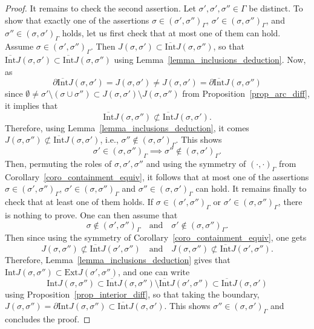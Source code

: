 \documentclass[a4paper, 11pt]{article} %
\theoremstyle{plain}
\newcommand{\Int}{\mathrm{Int}}
\newcommand{\clInt}{\overline{\mathrm{Int}}}
\newcommand{\Ext}{\mathrm{Ext}}
\newcommand{\1}{\mathds 1}
\numberwithin{equation}{section}
\begin{document}
\begin{proof}
    It remains to check the second assertion. Let $\sigma',\sigma',\sigma''\in\Gamma$ be distinct. To show that exactly one of the assertions $\sigma\in(\sigma',\sigma'')_\Gamma$, $\sigma'\in(\sigma,\sigma'')_\Gamma$, and $\sigma''\in(\sigma,\sigma')_\Gamma$ holds, let us first check that at most one of them can hold. Assume $\sigma\in(\sigma',\sigma'')_\Gamma$. Then $J(\sigma,\sigma')\subset\clInt J(\sigma,\sigma'')$, so that $\clInt J(\sigma,\sigma')\subset\clInt J(\sigma,\sigma'')$ using Lemma~\ref{lemma_inclusions_deduction}. Now, as
        \[\partial \clInt J(\sigma,\sigma')=J(\sigma,\sigma')\neq J(\sigma,\sigma')=\partial\clInt J(\sigma,\sigma'')\]
    since $\emptyset\neq\sigma'\setminus(\sigma\cup\sigma'')\subset J(\sigma,\sigma')\setminus J(\sigma,\sigma'')$ from Proposition~\ref{prop_arc_diff}, it implies that
        \[\clInt J(\sigma,\sigma'')\not\subset\clInt J(\sigma,\sigma').\]
    Therefore, using Lemma~\ref{lemma_inclusions_deduction}, it comes $J(\sigma,\sigma'')\not\subset\clInt J(\sigma,\sigma')$, i.e., $\sigma''\notin(\sigma,\sigma')_\Gamma$. This shows
        \[\sigma'\in(\sigma,\sigma'')_\Gamma\implies \sigma''\notin(\sigma,\sigma')_\Gamma.\]
    Then, permuting the roles of $\sigma,\sigma',\sigma''$ and using the symmetry of $(\cdot,\cdot)_\Gamma$ from Corollary~\ref{coro_containment_equiv}, it follows that at most one of the assertions $\sigma\in(\sigma',\sigma'')_\Gamma$, $\sigma'\in(\sigma,\sigma'')_\Gamma$ and $\sigma''\in(\sigma,\sigma')_\Gamma$ can hold. It remains finally to check that at least one of them holds. If $\sigma\in(\sigma',\sigma'')_\Gamma$ or $\sigma'\in(\sigma,\sigma'')_\Gamma$, there is nothing to prove. One can then assume that
        \[\sigma\notin(\sigma',\sigma'')_\Gamma\quad\text{and}\quad \sigma'\notin(\sigma,\sigma'')_\Gamma.\]
    Then since using the symmetry of Corollary~\ref{coro_containment_equiv}, one gets
        \[J(\sigma,\sigma'')\not\subset\clInt J(\sigma',\sigma'')\quad\text{and}\quad J(\sigma,\sigma'')\not\subset\clInt J(\sigma',\sigma'').\]
    Therefore, Lemma~\ref{lemma_inclusions_deduction} gives that $\Int J(\sigma,\sigma'')\subset\Ext J(\sigma',\sigma'')$, and one can write
        \[\Int J(\sigma,\sigma'')\subset \clInt J(\sigma,\sigma'')\setminus\clInt J(\sigma',\sigma'')\subset\clInt J(\sigma,\sigma')\]
    using Proposition~\ref{prop_interior_diff}, so that taking the boundary, $J(\sigma,\sigma'')=\partial\Int J(\sigma,\sigma'')\subset\clInt J(\sigma,\sigma')$. This shows $\sigma''\in(\sigma,\sigma')_\Gamma$ and concludes the proof.
\end{proof}
\end{document}
